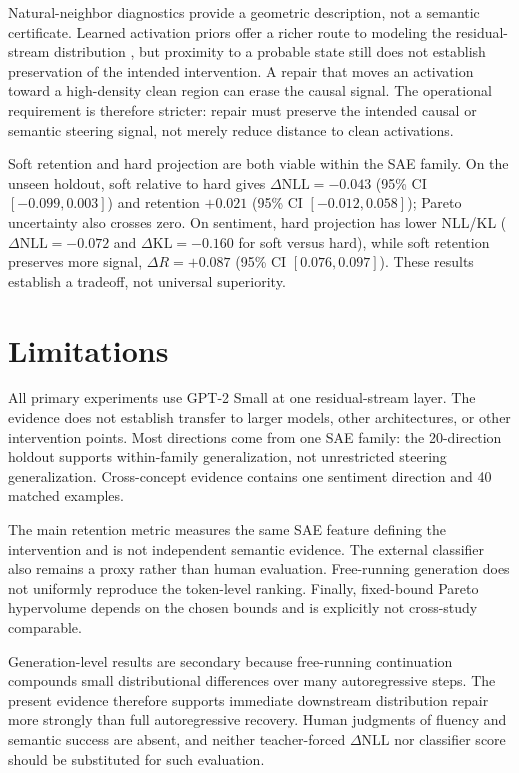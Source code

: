 \documentclass[11pt,twocolumn]{article}
\newcommand{\dNLL}{\Delta\mathrm{NLL}}
\begin{document}
Natural-neighbor diagnostics provide a geometric description, not a semantic certificate. Learned activation priors offer a richer route to modeling the residual-stream distribution \citep{luo2026glp}, but proximity to a probable state still does not establish preservation of the intended intervention. A repair that moves an activation toward a high-density clean region can erase the causal signal. The operational requirement is therefore stricter: repair must preserve the intended causal or semantic steering signal, not merely reduce distance to clean activations.

Soft retention and hard projection are both viable within the SAE family. On the unseen holdout, soft relative to hard gives $\dNLL=-0.043$ (95\% CI $[-0.099,0.003]$) and retention $+0.021$ (95\% CI $[-0.012,0.058]$); Pareto uncertainty also crosses zero. On sentiment, hard projection has lower NLL/KL ($\dNLL=-0.072$ and $\Delta\mathrm{KL}=-0.160$ for soft versus hard), while soft retention preserves more signal, $\Delta R=+0.087$ (95\% CI $[0.076,0.097]$). These results establish a tradeoff, not universal superiority.

\section{Limitations}
All primary experiments use GPT-2 Small at one residual-stream layer. The evidence does not establish transfer to larger models, other architectures, or other intervention points. Most directions come from one SAE family: the 20-direction holdout supports within-family generalization, not unrestricted steering generalization. Cross-concept evidence contains one sentiment direction and 40 matched examples.

The main retention metric measures the same SAE feature defining the intervention and is not independent semantic evidence. The external classifier also remains a proxy rather than human evaluation. Free-running generation does not uniformly reproduce the token-level ranking. Finally, fixed-bound Pareto hypervolume depends on the chosen bounds and is explicitly not cross-study comparable.

Generation-level results are secondary because free-running continuation compounds small distributional differences over many autoregressive steps. The present evidence therefore supports immediate downstream distribution repair more strongly than full autoregressive recovery. Human judgments of fluency and semantic success are absent, and neither teacher-forced $\dNLL$ nor classifier score should be substituted for such evaluation.
\end{document}
